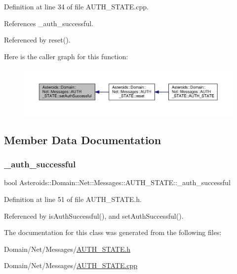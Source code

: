 Definition at line 34 of file A\+U\+T\+H\+\_\+\+S\+T\+A\+T\+E.\+cpp.



References \+\_\+auth\+\_\+successful.



Referenced by reset().

Here is the caller graph for this function\+:\nopagebreak
\begin{figure}[H]
\begin{center}
\leavevmode
\includegraphics[width=350pt]{classAsteroids_1_1Domain_1_1Net_1_1Messages_1_1AUTH__STATE_a7f307b3e98dee115df05cc6d574ed2d0_icgraph}
\end{center}
\end{figure}


\subsection{Member Data Documentation}
\mbox{\label{classAsteroids_1_1Domain_1_1Net_1_1Messages_1_1AUTH__STATE_a727148b2b2248fa4160982e6c15b96d7}} 
\subsubsection{\texorpdfstring{\+\_\+auth\+\_\+successful}{\_auth\_successful}}
{\footnotesize\ttfamily bool Asteroids\+::\+Domain\+::\+Net\+::\+Messages\+::\+A\+U\+T\+H\+\_\+\+S\+T\+A\+T\+E\+::\+\_\+auth\+\_\+successful\hspace{0.3cm}{\ttfamily [private]}}



Definition at line 51 of file A\+U\+T\+H\+\_\+\+S\+T\+A\+T\+E.\+h.



Referenced by is\+Auth\+Successful(), and set\+Auth\+Successful().



The documentation for this class was generated from the following files\+:\begin{DoxyCompactItemize}
\item 
Domain/\+Net/\+Messages/\hyperlink{AUTH__STATE_8h}{A\+U\+T\+H\+\_\+\+S\+T\+A\+T\+E.\+h}\item 
Domain/\+Net/\+Messages/\hyperlink{AUTH__STATE_8cpp}{A\+U\+T\+H\+\_\+\+S\+T\+A\+T\+E.\+cpp}\end{DoxyCompactItemize}
